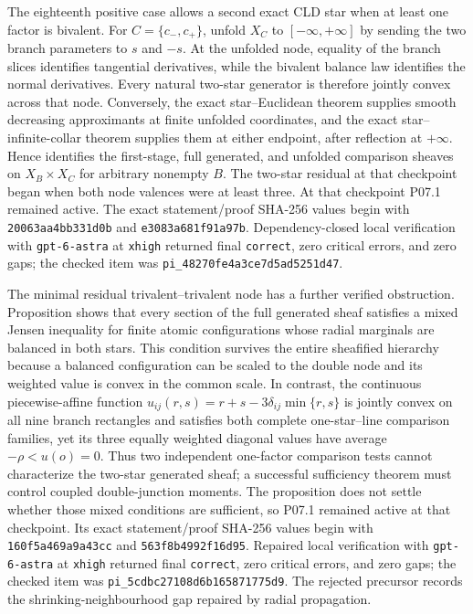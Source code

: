 The eighteenth positive case allows a second exact CLD star when at least
one factor is bivalent.  For \(C=\{c_-,c_+\}\), unfold \(X_C\) to
\([-\infty,+\infty]\) by sending the two branch parameters to \(s\) and \(-s\).
At the unfolded node, equality of the branch slices identifies tangential
derivatives, while the bivalent balance law identifies the normal
derivatives.  Every natural two-star generator is therefore jointly convex
across that node.  Conversely, the exact star--Euclidean theorem supplies
smooth decreasing approximants at finite unfolded coordinates, and the
exact star--infinite-collar theorem supplies them at either endpoint, after
reflection at \(+\infty\).  Hence
 identifies the first-stage,
full generated, and unfolded comparison sheaves on \(X_B\times X_C\) for
arbitrary nonempty \(B\).  The two-star residual at that checkpoint began when both node valences
were at least three.  At that checkpoint P07.1 remained active.  The exact
statement/proof SHA-256 values begin with \texttt{20063aa4bb331d0b} and
\texttt{e3083a681f91a97b}.  Dependency-closed local verification with
\texttt{gpt-6-astra} at \texttt{xhigh} returned final \texttt{correct},
zero critical errors, and zero gaps; the checked item was
\nolinkurl{pi_48270fe4a3ce7d5ad5251d47}.

The minimal residual trivalent--trivalent node has a further verified
obstruction.  Proposition
 shows that every
section of the full generated sheaf satisfies a mixed Jensen inequality for
finite atomic configurations whose radial marginals are balanced in both
stars.  This condition survives the entire sheafified hierarchy because a
balanced configuration can be scaled to the double node and its weighted
value is convex in the common scale.  In contrast, the continuous
piecewise-affine function
\(u_{ij}(r,s)=r+s-3\delta_{ij}\min\{r,s\}\) is jointly convex on all nine
branch rectangles and satisfies both complete one-star--line comparison
families, yet its three equally weighted diagonal values have average
\(-\rho<u(o)=0\).  Thus two independent one-factor comparison tests cannot
characterize the two-star generated sheaf; a successful sufficiency theorem
must control coupled double-junction moments.  The proposition does not
settle whether those mixed conditions are sufficient, so P07.1 remained active at that checkpoint.  Its exact statement/proof SHA-256 values begin with
\texttt{160f5a469a9a43cc} and \texttt{563f8b4992f16d95}.  Repaired local
verification with \texttt{gpt-6-astra} at \texttt{xhigh} returned final
\texttt{correct}, zero critical errors, and zero gaps; the checked item was
\nolinkurl{pi_5cdbc27108d6b165871775d9}.  The rejected precursor records the
shrinking-neighbourhood gap repaired by radial propagation.

